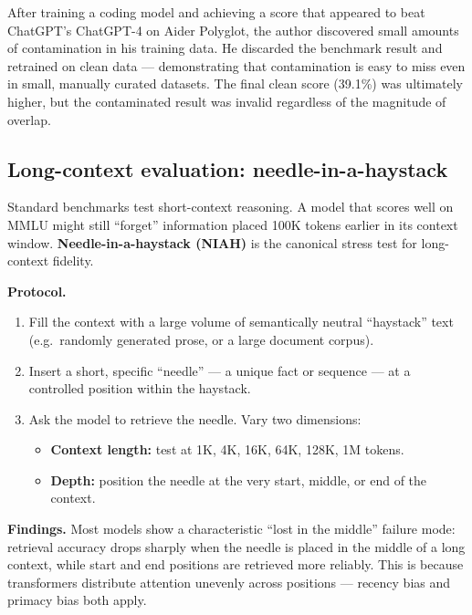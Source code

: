 \begin{warnbox}[title=Real-world example: PewDiePie's coding model]
  After training a coding model and achieving a score that appeared to beat ChatGPT's
  ChatGPT-4 on Aider Polyglot, the author discovered small amounts of contamination
  in his training data. He discarded the benchmark result and retrained on clean data
  --- demonstrating that contamination is easy to miss even in small, manually curated
  datasets. The final clean score (39.1\%) was ultimately higher, but the contaminated
  result was invalid regardless of the magnitude of overlap.
\end{warnbox}

\subsection{Long-context evaluation: needle-in-a-haystack}

Standard benchmarks test short-context reasoning. A model that scores well on MMLU
might still ``forget'' information placed 100K tokens earlier in its context window.
\textbf{Needle-in-a-haystack (NIAH)} is the canonical stress test for long-context
fidelity.

\textbf{Protocol.}
\begin{enumerate}
  \item Fill the context with a large volume of semantically neutral ``haystack'' text
    (e.g.\ randomly generated prose, or a large document corpus).
  \item Insert a short, specific ``needle'' --- a unique fact or sequence --- at a
    controlled position within the haystack.
  \item Ask the model to retrieve the needle. Vary two dimensions:
    \begin{itemize}
      \item \textbf{Context length:} test at 1K, 4K, 16K, 64K, 128K, 1M tokens.
      \item \textbf{Depth:} position the needle at the very start, middle, or end of
        the context.
    \end{itemize}
\end{enumerate}

\textbf{Findings.} Most models show a characteristic ``lost in the middle'' failure
mode: retrieval accuracy drops sharply when the needle is placed in the middle of
a long context, while start and end positions are retrieved more reliably. This is
because transformers distribute attention unevenly across positions --- recency bias
and primacy bias both apply.


